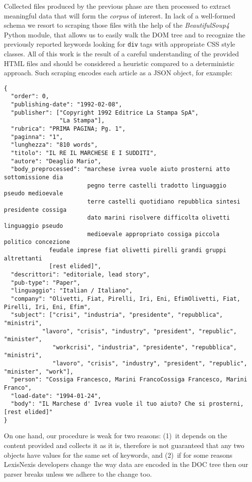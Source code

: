 \documentclass[a4paper]{article}
\begin{document}
Collected files produced by the previous phase are then processed to extract
meaningful data that will form the \emph{corpus} of interest. In lack of a
well-formed schema we resort to scraping those files with the help of the
\emph{BeautifulSoup4} Python module, that allows us to easily walk the DOM tree
and to recognize the previously reported keywords looking for \verb|div| tags
with appropriate CSS style classes. All of this work is the result of a careful
understanding of the provided HTML files and should be considered a heuristic
compared to a deterministic approach.  Such scraping encodes each article as a
JSON object, for example:
\begin{Verbatim}[fontsize=\footnotesize]
{
  "order": 0, 
  "publishing-date": "1992-02-08", 
  "publisher": ["Copyright 1992 Editrice La Stampa SpA", 
                "La Stampa"], 
  "rubrica": "PRIMA PAGINA; Pg. 1", 
  "paginna": "1", 
  "lunghezza": "810 words", 
  "titolo": "IL RE IL MARCHESE E I SUDDITI", 
  "autore": "Deaglio Mario", 
  "body_preprocessed": "marchese ivrea vuole aiuto prosterni atto sottomissione dia 
                        pegno terre castelli tradotto linguaggio pseudo medioevale 
                        terre castelli quotidiano repubblica sintesi presidente cossiga 
                        dato marini risolvere difficolta olivetti linguaggio pseudo 
                        medioevale appropriato cossiga piccola politico concezione 
       		 feudale imprese fiat olivetti pirelli grandi gruppi altrettanti 
       		 [rest elided]", 
  "descrittori": "editoriale, lead story", 
  "pub-type": "Paper", 
  "linguaggio": "Italian / Italiano", 
  "company": "Olivetti, Fiat, Pirelli, Iri, Eni, EfimOlivetti, Fiat, Pirelli, Iri, Eni, Efim", 
  "subject": ["crisi", "industria", "presidente", "repubblica", "ministri", 
  	       "lavoro", "crisis", "industry", "president", "republic", "minister", 
              "workcrisi", "industria", "presidente", "repubblica", "ministri", 
              "lavoro", "crisis", "industry", "president", "republic", "minister", "work"], 
  "person": "Cossiga Francesco, Marini FrancoCossiga Francesco, Marini Franco", 
  "load-date": "1994-01-24", 
  "body": "IL Marchese d' Ivrea vuole il tuo aiuto? Che si prosterni, [rest elided]"
}
\end{Verbatim}

On one hand, our procedure is weak for two reasons: (1)~it depends on the
content provided and collects it as it is, therefore is not guaranteed that any
two objects have values for the same set of keywords, and (2)~if for some
reasons LexisNexis developers change the way data are encoded in the DOC tree
then our parser breaks unless we adhere to the change too. 
\end{document}
